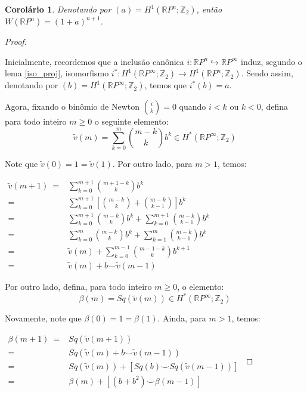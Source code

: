 \documentclass[12pt,oneside]{book} %
\newtheorem{cor}    {\hspace{0.5cm}Corol\'ario}[chapter]
\newcommand{\ds}{\displaystyle}
\newcommand{\RP}{\mathbb{R}P}
\newcommand{\Z}{\mathbb{Z}}
\newcommand{\ccup}{\smile}
\newcommand{\wt}{\widetilde}
\begin{document}
\begin{cor}\label{ap_wu_7}
	Denotando por $(a)=H^{1}(\RP^{n};\Z_{2})$, então $W(\RP^{n})=(1+a)^{n+1}$.
\end{cor}

\begin{proof}
	
	\
	
	\par Inicialmente, recordemos que a inclusão canônica $i:\RP^{n}\hookrightarrow\RP^{\infty}$ induz, segundo o lema \ref{iso_proj}, isomorfismo $i^{*}:H^{1}(\RP^{\infty};\Z_{2})\to H^{1}(\RP^{n};\Z_{2})$. Sendo assim, denotando por $(b)=H^{1}(\RP^{\infty};\Z_{2})$, temos que $i^{*}(b)=a$.
	
	\par Agora, fixando o binômio de Newton $\binom{i}{k}=0$ quando $i<k$ ou $k<0$, defina para todo inteiro $m\geq 0$ o seguinte elemento:
	$$ \wt{v}(m)=\ds\sum_{k=0}^{m}\binom{m-k}{k}b^{k}\in H^{*}(\RP^{\infty};\Z_{2}) $$
	
	\par Note que $\wt{v}(0)=1=\wt{v}(1)$. Por outro lado, para $m>1$, temos: \newline
	
	$ \begin{array}{rl}
		\wt{v}(m+1) \ = & \ds\sum_{k=0}^{m+1}\binom{m+1-k}{k}b^{k} \\
		= & \ds\sum_{k=0}^{m+1}\left[ \binom{m-k}{k}+\binom{m-k}{k-1} \right]b^{k} \\
		= & \ds\sum_{k=0}^{m+1}\binom{m-k}{k}b^{k}+\ds\sum_{k=0}^{m+1}\binom{m-k}{k-1}b^{k} \\
		= & \ds\sum_{k=0}^{m}\binom{m-k}{k}b^{k}+\ds\sum_{k=1}^{m}\binom{m-k}{k-1}b^{k} \\
		= & \wt{v}(m)+\ds\sum_{k=0}^{m-1}\binom{m-1-k}{k}b^{k+1} \\
		= & \wt{v}(m)+b\ccup \wt{v}(m-1)
	\end{array} $ \newline
	
	\par Por outro lado, defina, para todo inteiro $m\geq 0$, o elemento:
	$$ \beta(m)=Sq(\wt{v}(m))\in H^{*}(\RP^{\infty};\Z_{2}) $$
	
	\par Novamente, note que $\beta(0)=1=\beta(1)$. Ainda, para $m>1$, temos: \newline
	
	$ \begin{array}{rl}
		\beta(m+1) \ = & Sq(\wt{v}(m+1)) \\
		= & Sq(\wt{v}(m)+b\ccup\wt{v}(m-1)) \\
		= & Sq(\wt{v}(m))+\left[ Sq(b)\ccup Sq(\wt{v}(m-1)) \right] \\
		= & \beta(m)+\left[ (b+b^{2})\ccup\beta(m-1) \right]
	\end{array} $ \newline
	

\end{proof}
\end{document}
